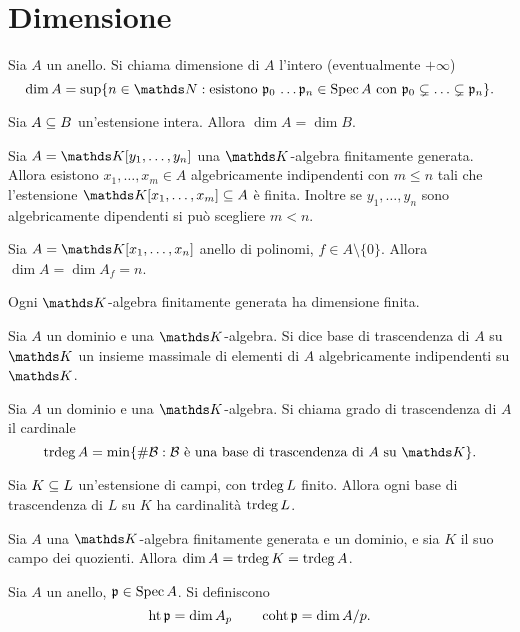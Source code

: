 \section{Dimensione}
\begin{definition}
Sia $A$ un anello. Si chiama dimensione di $A$ l'intero (eventualmente $+\infty$)
$$
\dim A=\sup\{n\in\NN:\text{esistono $\pp_0\,\ldots\pp_n\in\Spec A$ con $\pp_0\subsn\ldots\subsn\pp_n$}\}.
$$
\end{definition}
\begin{proposition}
Sia $A\subseteq B$ un'estensione intera. Allora $\dim A=\dim B$.
\end{proposition}
\begin{proposition}
Sia $A=\KK[y_1,\ldots,y_n]$ una $\KK$-algebra finitamente generata. Allora esistono $x_1,\ldots,x_m\in A$ algebricamente indipendenti con $m\le n$ tali che l'estensione $\KK[x_1,\ldots,x_m]\subs A$ è finita. Inoltre se $y_1,\ldots,y_n$ sono algebricamente dipendenti si può scegliere $m<n$.
\end{proposition}
\begin{proposition}
Sia $A=\KK[x_1,\ldots,x_n]$ anello di polinomi, $f\in A\setminus\{0\}$. Allora $\dim A=\dim A_f=n$.
\end{proposition}
\begin{corollary}
Ogni $\KK$-algebra finitamente generata ha dimensione finita.
\end{corollary}
\begin{definition}
Sia $A$ un dominio e una $\KK$-algebra. Si dice base di trascendenza di $A$ su $\KK$ un insieme massimale di elementi di $A$ algebricamente indipendenti su $\KK$.
\end{definition}
\begin{definition}
Sia $A$ un dominio e una $\KK$-algebra. Si chiama grado di trascendenza di $A$ il cardinale
$$
\trdeg A=\min\{\#\mathcal{B}:\text{$\mathcal{B}$ è una base di trascendenza di $A$ su $\KK$}\}.
$$
\end{definition}
\begin{proposition}
Sia $K\subseteq L$ un'estensione di campi, con $\operatorname{trdeg} L$ finito. Allora ogni base di trascendenza di $L$ su $K$ ha cardinalità $\operatorname{trdeg} L$.
\end{proposition}
\begin{corollary}
Sia $A$ una $\KK$-algebra finitamente generata e un dominio, e sia $K$ il suo campo dei quozienti. Allora $\dim A=\operatorname{trdeg} K=\operatorname{trdeg} A$.
\end{corollary}
\begin{definition}
Sia $A$ un anello, $\mathfrak{p}\in\operatorname{Spec} A$. Si definiscono
$$
\operatorname{ht}\mathfrak{p}=\dim A_p\qquad\operatorname{coht}\mathfrak{p}=\dim A/p.
$$
\end{definition}
